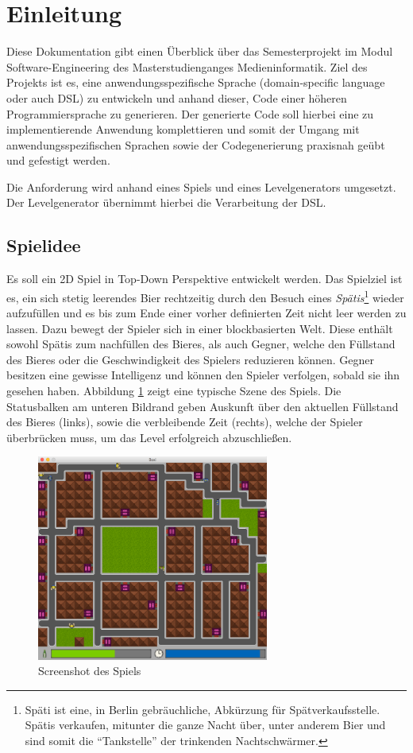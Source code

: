 \section{Einleitung}

Diese Dokumentation gibt einen Überblick über das Semesterprojekt im Modul Software-Engineering des Masterstudienganges Medieninformatik.
Ziel des Projekts ist es, eine anwendungsspezifische Sprache (domain-specific language oder auch DSL) zu entwickeln und anhand dieser, Code einer höheren Programmiersprache zu generieren.
Der generierte Code soll hierbei eine zu implementierende Anwendung komplettieren und somit der Umgang mit anwendungsspezifischen Sprachen sowie der Codegenerierung praxisnah geübt und gefestigt werden.

Die Anforderung wird anhand eines Spiels und eines Levelgenerators umgesetzt.
Der Levelgenerator übernimmt hierbei die Verarbeitung der DSL.

\subsection{Spielidee}

Es soll ein 2D Spiel in Top-Down Perspektive entwickelt werden.
Das Spielziel ist es, ein sich stetig leerendes Bier rechtzeitig durch den Besuch eines \textit{Spätis}\footnote{Späti ist eine, in Berlin gebräuchliche, Abkürzung für Spätverkaufsstelle. Spätis verkaufen, mitunter die ganze Nacht über, unter anderem Bier und sind somit die ``Tankstelle'' der trinkenden Nachtschwärmer.}
wieder aufzufüllen und es bis zum Ende einer vorher definierten Zeit nicht leer werden zu lassen.
Dazu bewegt der Spieler sich in einer blockbasierten Welt.
Diese enthält sowohl Spätis zum nachfüllen des Bieres, als auch Gegner, welche den Füllstand des Bieres oder die Geschwindigkeit des Spielers reduzieren können.
Gegner besitzen eine gewisse Intelligenz und können den Spieler verfolgen, sobald sie ihn gesehen haben.
Abbildung \ref{fig:einleitung:screenshot} zeigt eine typische Szene des Spiels.
Die Statusbalken am unteren Bildrand geben Auskunft über den aktuellen Füllstand des Bieres (links), sowie die verbleibende Zeit (rechts), welche der Spieler überbrücken muss, um das Level erfolgreich abzuschließen.

\begin{figure}[]
\centering
\includegraphics[width=3in]{img/02_screenshot.png}
\caption{Screenshot des Spiels}
\label{fig:einleitung:screenshot}
\end{figure}



